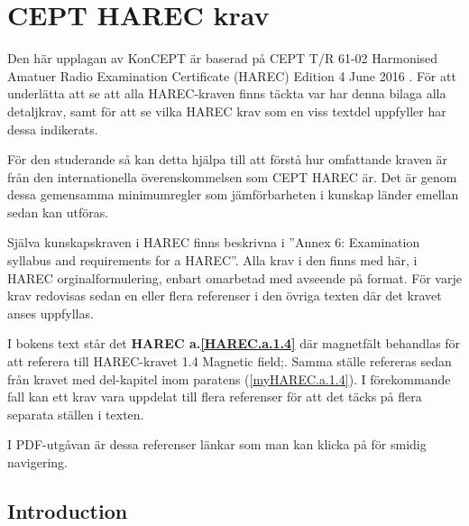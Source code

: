 
\chapter{CEPT HAREC krav}
\label{CEPT HAREC}

Den här upplagan av KonCEPT är baserad på CEPT T/R 61-02 Harmonised Amatuer
Radio Examination Certificate (HAREC) Edition 4 June 2016 \cite{TR6102}.
För att underlätta att se att alla HAREC-kraven finns täckta var har denna
bilaga alla detaljkrav, samt för att se vilka HAREC krav som en viss textdel
uppfyller har dessa indikerats.

För den studerande så kan detta hjälpa till att förstå hur omfattande kraven är
från den internationella överenskommelsen som CEPT HAREC är.
Det är genom dessa gemensamma minimumregler som jämförbarheten i kunskap
länder emellan sedan kan utföras.

Själva kunskapskraven i HAREC finns beskrivna i
''Annex 6: Examination syllabus and requirements for a HAREC''.
Alla krav i den finns med här, i HAREC orginalformulering, enbart omarbetad
med avseende på format.
För varje krav redovisas sedan en eller flera referenser i den övriga texten
där det kravet anses uppfyllas.

I bokens text står det \textbf{HAREC a.\ref{HAREC.a.1.4}} där magnetfält
behandlas för att referera till HAREC-kravet 1.4 Magnetic field;.
Samma ställe refereras sedan från kravet med del-kapitel inom paratens
(\ref{myHAREC.a.1.4}).
I förekommande fall kan ett krav vara uppdelat till flera referenser för att
det täcks på flera separata ställen i texten.

I PDF-utgåvan är dessa referenser länkar som man kan klicka på för smidig
navigering.

\section{Introduction}

\makeatletter
\renewcommand{\theenumii}{\arabic{enumii}}
\renewcommand{\labelenumii}{\theenumi.\theenumii}
\renewcommand{\p@enumii}{\theenumi.}

\renewcommand{\theenumiii}{\arabic{enumiii}}
\renewcommand{\labelenumiii}{\theenumi.\theenumii.\theenumiii}
\renewcommand{\p@enumiii}{\theenumi.\theenumii.}
\makeatother

